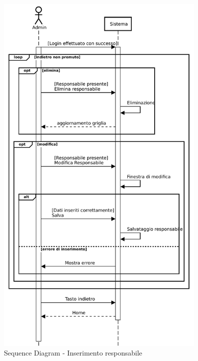 \documentclass[a4paper,11pt]{article}
\begin{document}
\begin{figure}[htpb]
	\centering
	\includegraphics[width=0.9\textwidth]{diagrams/Sequence_Diagram_-_InsResp_1.pdf}
	\caption{Sequence Diagram - Inserimento responsabile}
	\label{fig:seq_dia_ins_resp}
\end{figure}




\newpage
\end{document}
